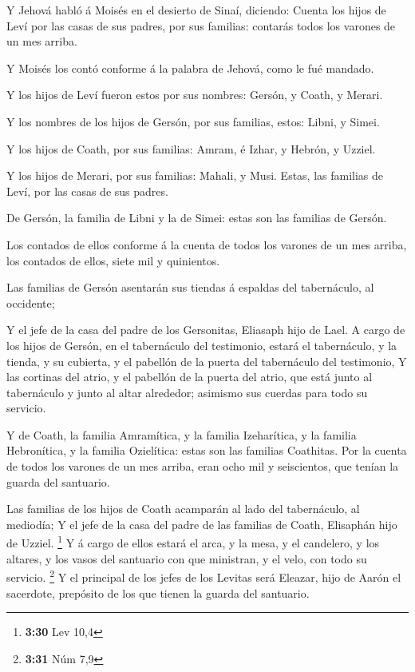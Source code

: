  Y Jehová habló á Moisés en el desierto de Sinaí, diciendo:
 Cuenta los hijos de Leví por las casas de sus padres, por
sus familias: contarás todos los varones de un mes arriba.

 Y Moisés los contó conforme á la palabra de Jehová, como
le fué mandado.

 Y los hijos de Leví fueron estos por sus nombres: Gersón,
y Coath, y Merari.

 Y los nombres de los hijos de Gersón, por sus familias,
estos: Libni, y Simei.

 Y los hijos de Coath, por sus familias: Amram, é Izhar, y
Hebrón, y Uzziel.

 Y los hijos de Merari, por sus familias: Mahali, y Musi.
Estas, las familias de Leví, por las casas de sus padres.

 De Gersón, la familia de Libni y la de Simei: estas son
las familias de Gersón.

 Los contados de ellos conforme á la cuenta de todos los
varones de un mes arriba, los contados de ellos, siete mil y quinientos.

 Las familias de Gersón asentarán sus tiendas á espaldas
del tabernáculo, al occidente;

 Y el jefe de la casa del padre de los Gersonitas, Eliasaph
hijo de Lael.  A cargo de los hijos de Gersón, en el
tabernáculo del testimonio, estará el tabernáculo, y la tienda, y su
cubierta, y el pabellón de la puerta del tabernáculo del testimonio,
 Y las cortinas del atrio, y el pabellón de la puerta del
atrio, que está junto al tabernáculo y junto al altar alrededor;
asimismo sus cuerdas para todo su servicio.

 Y de Coath, la familia Amramítica, y la familia
Izeharítica, y la familia Hebronítica, y la familia Ozielítica: estas
son las familias Coathitas.  Por la cuenta de todos los
varones de un mes arriba, eran ocho mil y seiscientos, que tenían la
guarda del santuario.

 Las familias de los hijos de Coath acamparán al lado del
tabernáculo, al mediodía;  Y el jefe de la casa del padre
de las familias de Coath, Elisaphán hijo de Uzziel. \footnote{\textbf{3:30}
  Lev 10,4}  Y á cargo de ellos estará el arca, y la mesa,
y el candelero, y los altares, y los vasos del santuario con que
ministran, y el velo, con todo su servicio. \footnote{\textbf{3:31} Núm
  7,9}  Y el principal de los jefes de los Levitas será
Eleazar, hijo de Aarón el sacerdote, prepósito de los que tienen la
guarda del santuario.

